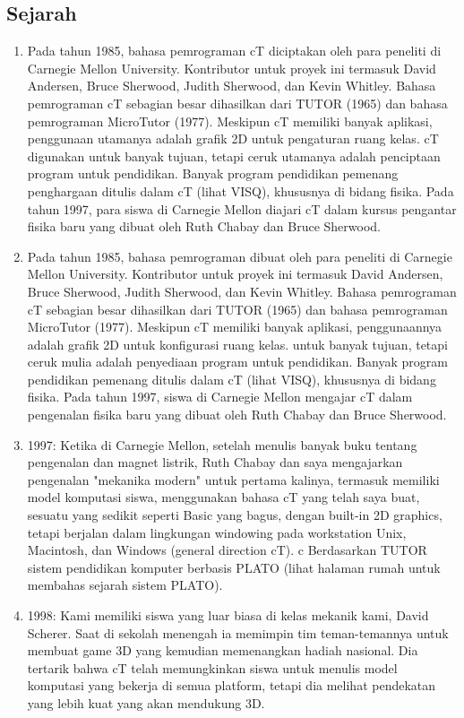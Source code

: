 \subsection{Sejarah}
		\begin{enumerate}
			\item Pada tahun 1985, bahasa pemrograman cT diciptakan oleh para peneliti di Carnegie Mellon University. Kontributor untuk proyek ini termasuk David Andersen, Bruce Sherwood, Judith Sherwood, dan Kevin Whitley. Bahasa pemrograman cT sebagian besar dihasilkan dari TUTOR (1965) dan bahasa pemrograman MicroTutor (1977). Meskipun cT memiliki banyak aplikasi, penggunaan utamanya adalah grafik 2D untuk pengaturan ruang kelas. cT digunakan untuk banyak tujuan, tetapi ceruk utamanya adalah penciptaan program untuk pendidikan. Banyak program pendidikan pemenang penghargaan ditulis dalam cT (lihat VISQ), khususnya di bidang fisika. Pada tahun 1997, para siswa di Carnegie Mellon diajari cT dalam kursus pengantar fisika baru yang dibuat oleh Ruth Chabay dan Bruce Sherwood.
			\item Pada tahun 1985, bahasa pemrograman dibuat oleh para peneliti di Carnegie Mellon University. Kontributor untuk proyek ini termasuk David Andersen, Bruce Sherwood, Judith Sherwood, dan Kevin Whitley. Bahasa pemrograman cT sebagian besar dihasilkan dari TUTOR (1965) dan bahasa pemrograman MicroTutor (1977). Meskipun cT memiliki banyak aplikasi, penggunaannya adalah grafik 2D untuk konfigurasi ruang kelas. untuk banyak tujuan, tetapi ceruk mulia adalah penyediaan program untuk pendidikan. Banyak program pendidikan pemenang ditulis dalam cT (lihat VISQ), khususnya di bidang fisika. Pada tahun 1997, siswa di Carnegie Mellon mengajar cT dalam pengenalan fisika baru yang dibuat oleh Ruth Chabay dan Bruce Sherwood.
			\item 1997: Ketika di Carnegie Mellon, setelah menulis banyak buku tentang pengenalan dan magnet listrik, Ruth Chabay dan saya mengajarkan pengenalan "mekanika modern" untuk pertama kalinya, termasuk memiliki model komputasi siswa, menggunakan bahasa cT yang telah saya buat, sesuatu yang sedikit seperti Basic yang bagus, dengan built-in 2D graphics, tetapi berjalan dalam lingkungan windowing pada workstation Unix, Macintosh, dan Windows (general direction cT). c Berdasarkan TUTOR sistem pendidikan komputer berbasis PLATO (lihat halaman rumah untuk membahas sejarah sistem PLATO).
			\item 1998: Kami memiliki siswa yang luar biasa di kelas mekanik kami, David Scherer. Saat di sekolah menengah ia memimpin tim teman-temannya untuk membuat game 3D yang kemudian memenangkan hadiah nasional. Dia tertarik bahwa cT telah memungkinkan siswa untuk menulis model komputasi yang bekerja di semua platform, tetapi dia melihat pendekatan yang lebih kuat yang akan mendukung 3D.

\end{enumerate}
